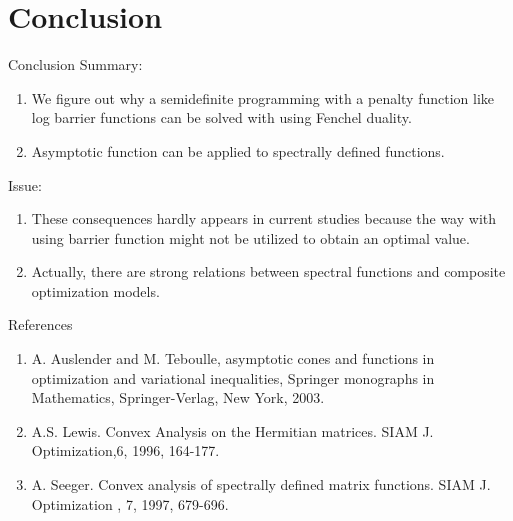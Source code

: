 \documentclass[aspectratio=169, dvipdfmx, 11pt]{beamer}
\begin{document}
\section{Conclusion}

\begin{frame}{Conclusion}
  Summary:
  \begin{enumerate}[]
    \item We figure out why a semidefinite programming with a penalty function like log barrier functions can be solved with using Fenchel duality.
    \item Asymptotic function can be applied to spectrally defined functions.
  \end{enumerate}
  Issue:
  \begin{enumerate}[]
    \item These consequences hardly appears in current studies because the way with using barrier function might not be utilized to obtain an optimal value.
    \item Actually, there are strong relations between spectral functions and composite optimization models.
  \end{enumerate}
\end{frame}

\begin{frame}[t]{References}
  \begin{enumerate}[]
    \item A. Auslender and M. Teboulle, asymptotic cones and functions in optimization and variational inequalities, Springer monographs in Mathematics, Springer-Verlag, New York, 2003.
    \item A.S. Lewis. Convex Analysis on the Hermitian matrices. SIAM J. Optimization,6, 1996, 164-177.
    \item A. Seeger. Convex analysis of spectrally defined matrix functions. SIAM J. Optimization , 7, 1997, 679-696.
  \end{enumerate}
\end{frame}
\end{document}
